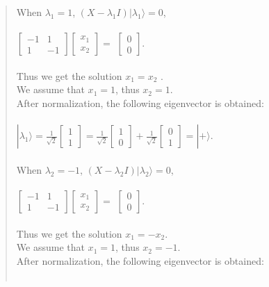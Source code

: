 \documentclass[UTF8]{ctexart}
\begin{document}
\begin{quote}
	When $\lambda_{1}=1$,
    	$(X-\lambda_{1} I )|\lambda_{1}\rangle=0$, \\  \\
	$\begin{bmatrix}-1&1\\1&-1\end{bmatrix}\begin{bmatrix}x_{1}\\x_{2}\end{bmatrix}=$
	$\begin{bmatrix}0\\0\end{bmatrix}$. \\  \\ 
	Thus we get the solution $x_{1}=x_{2}$ .\\ 
	We  assume that $x_{1}=1$, thus $x_{2}=1$.  \\ 
	After normalization, the following eigenvector is obtained:\\  \\
	$|\lambda_{1}\rangle=\frac{1}{\sqrt{2}}\begin{bmatrix}1\\1\end{bmatrix}
	=\frac{1}{\sqrt{2}}\begin{bmatrix}1\\0\end{bmatrix}+\frac{1}{\sqrt{2}}\begin{bmatrix}0\\1\end{bmatrix}
	=|+\rangle$. \\  \\
	When $\lambda_{2}=-1$,
	$(X-\lambda_{2} I)|\lambda_{2}\rangle=0$, \\  \\
	$\begin{bmatrix}-1&1\\1&-1\end{bmatrix}\begin{bmatrix}x_{1}\\x_{2}\end{bmatrix}=$
	$\begin{bmatrix}0\\0\end{bmatrix}$. \\  \\ 
	Thus we get the solution $x_{1}=-x_{2}$.\\ 
	We  assume that $x_{1}=1$, thus $x_{2}=-1$.  \\
	After normalization, the following eigenvector is obtained:\\  \\

\end{quote}
\end{document}
